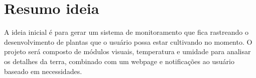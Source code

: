 \documentclass[main.tex]{subfiles}
\begin{document}
\section{Resumo ideia}
A ideia inicial é para gerar um sistema de monitoramento que fica rastreando o desenvolvimento de plantas que o usuário possa estar cultivando no momento. \newline
O projeto será composto de módulos visuais, temperatura e umidade para analisar os detalhes da terra, combinado com um webpage e notificações ao usuário baseado em necessidades. \newline
\end{document}
